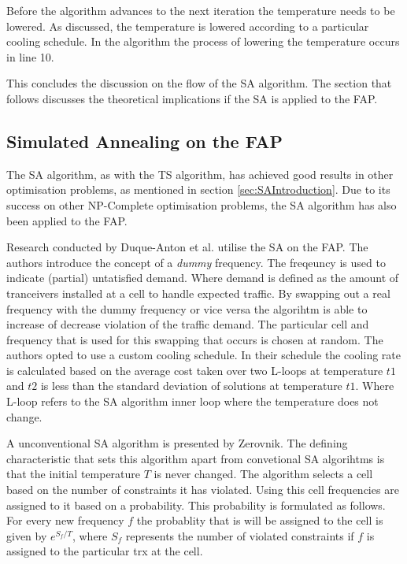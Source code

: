 Before the algorithm advances to the next iteration the temperature needs to be lowered. As discussed, the temperature is lowered according to a particular cooling schedule. In the algorithm the process of lowering the temperature occurs in line 10. 

This concludes the discussion on the flow of the SA algorithm. The section that follows discusses the theoretical implications if the \gls{SA} is applied to the \gls{FAP}.
\subsection{Simulated Annealing on the \gls{FAP}}
The \gls{SA} algorithm, as with the \gls{TS} algorithm, has achieved good results in other optimisation problems, as mentioned in section \ref{sec:SAIntroduction}. Due to its success on other NP-Complete optimisation problems, the \gls{SA} algorithm has also been applied to the \gls{FAP}.

Research conducted by Duque-Anton et al.\cite{SAChanAss} utilise the \gls{SA} on the FAP. The authors introduce the concept of a \emph{dummy} frequency. The freqeuncy is used to indicate (partial) untatisfied demand. Where demand is defined as the amount of tranceivers installed at a cell to handle expected traffic. By swapping out a real frequency with the dummy frequency or vice versa the algorihtm is able to increase of decrease violation of the traffic demand. The particular cell and frequency that is used for this swapping that occurs is chosen at random. The authors opted to use a custom cooling schedule. In their schedule the cooling rate is calculated based on the average cost taken over two L-loops at temperature $t1$ and $t2$ is less than the standard deviation of solutions at temperature $t1$. Where L-loop refers to the \gls{SA} algorithm inner loop where the temperature does not change.

A unconventional \gls{SA} algorithm  is presented by Zerovnik\cite{Zerovnik97}. The defining characteristic that sets this algorithm apart from convetional \gls{SA} algorihtms is that the initial temperature $T$ is never changed. The algorithm selects a cell based on the number of constraints it has violated. Using this cell frequencies are assigned to it based on a probability. This probability is formulated as follows. For every new frequency $f$ the probablity that is will be assigned to the cell is given by $e^{S_f/T}$, where $S_f$ represents the number of violated constraints if $f$ is assigned to the particular trx at the cell.

